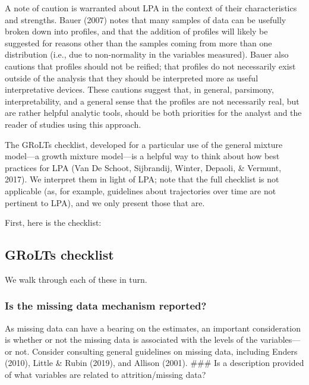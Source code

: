 \documentclass[man]{apa6}
\begin{document}
A note of caution is warranted about LPA in the context of their characteristics
and strengths. Bauer (2007) notes that many samples of data can be usefully
broken down into profiles, and that the addition of profiles will likely be
suggested for reasons other than the samples coming from more than one
distribution (i.e., due to non-normality in the variables measured). Bauer also
cautions that profiles should not be reified; that profiles do not necessarily
exist outside of the analysis that they should be interpreted more as useful
interpretative devices. These cautions suggest that, in general, parsimony,
interpretability, and a general sense that the profiles are not necessarily
real, but are rather helpful analytic tools, should be both priorities for the
analyst and the reader of studies using this approach.

The GRoLTs checklist, developed for a particular use of the general mixture
model---a growth mixture model---is a helpful way to think about how best
practices for LPA (Van De Schoot, Sijbrandij, Winter, Depaoli, \& Vermunt, 2017). We interpret them in light of LPA; note that
the full checklist is not applicable (as, for example, guidelines about
trajectories over time are not pertinent to LPA), and we only present those that
are.

First, here is the checklist:

\hypertarget{grolts-checklist}{%
\subsection{GRoLTs checklist}\label{grolts-checklist}}

\hypertarget{htmlwidget-fffc7926638efd89a6a8}{}

We walk through each of these in turn.

\hypertarget{is-the-missing-data-mechanism-reported}{%
\subsubsection{Is the missing data mechanism reported?}\label{is-the-missing-data-mechanism-reported}}

As missing data can have a bearing on the estimates, an important consideration is whether or not the missing data is associated with the levels of the variables---or not. Consider consulting general guidelines on missing data, including Enders (2010), Little \& Rubin (2019), and Allison (2001).
\#\#\# Is a description provided of what variables are related to attrition/missing data?
\end{document}

